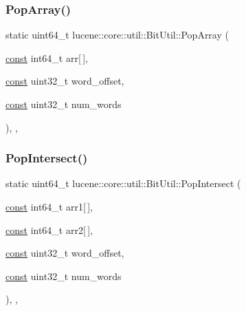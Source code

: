 \mbox{\label{classlucene_1_1core_1_1util_1_1BitUtil_a88df8d9e6ec36893009b4fb1c5359e28}} 
\subsubsection{\texorpdfstring{Pop\+Array()}{PopArray()}}
{\footnotesize\ttfamily static uint64\+\_\+t lucene\+::core\+::util\+::\+Bit\+Util\+::\+Pop\+Array (\begin{DoxyParamCaption}\item[{\mbox{\hyperlink{ZlibCrc32_8h_a2c212835823e3c54a8ab6d95c652660e}{const}} int64\+\_\+t}]{arr\mbox{[}$\,$\mbox{]},  }\item[{\mbox{\hyperlink{ZlibCrc32_8h_a2c212835823e3c54a8ab6d95c652660e}{const}} uint32\+\_\+t}]{word\+\_\+offset,  }\item[{\mbox{\hyperlink{ZlibCrc32_8h_a2c212835823e3c54a8ab6d95c652660e}{const}} uint32\+\_\+t}]{num\+\_\+words }\end{DoxyParamCaption})\hspace{0.3cm}{\ttfamily [inline]}, {\ttfamily [static]}, {\ttfamily [noexcept]}}

\mbox{\label{classlucene_1_1core_1_1util_1_1BitUtil_aa35baf5dac5a6731661e08da849410f4}} 
\subsubsection{\texorpdfstring{Pop\+Intersect()}{PopIntersect()}}
{\footnotesize\ttfamily static uint64\+\_\+t lucene\+::core\+::util\+::\+Bit\+Util\+::\+Pop\+Intersect (\begin{DoxyParamCaption}\item[{\mbox{\hyperlink{ZlibCrc32_8h_a2c212835823e3c54a8ab6d95c652660e}{const}} int64\+\_\+t}]{arr1\mbox{[}$\,$\mbox{]},  }\item[{\mbox{\hyperlink{ZlibCrc32_8h_a2c212835823e3c54a8ab6d95c652660e}{const}} int64\+\_\+t}]{arr2\mbox{[}$\,$\mbox{]},  }\item[{\mbox{\hyperlink{ZlibCrc32_8h_a2c212835823e3c54a8ab6d95c652660e}{const}} uint32\+\_\+t}]{word\+\_\+offset,  }\item[{\mbox{\hyperlink{ZlibCrc32_8h_a2c212835823e3c54a8ab6d95c652660e}{const}} uint32\+\_\+t}]{num\+\_\+words }\end{DoxyParamCaption})\hspace{0.3cm}{\ttfamily [inline]}, {\ttfamily [static]}, {\ttfamily [noexcept]}}

